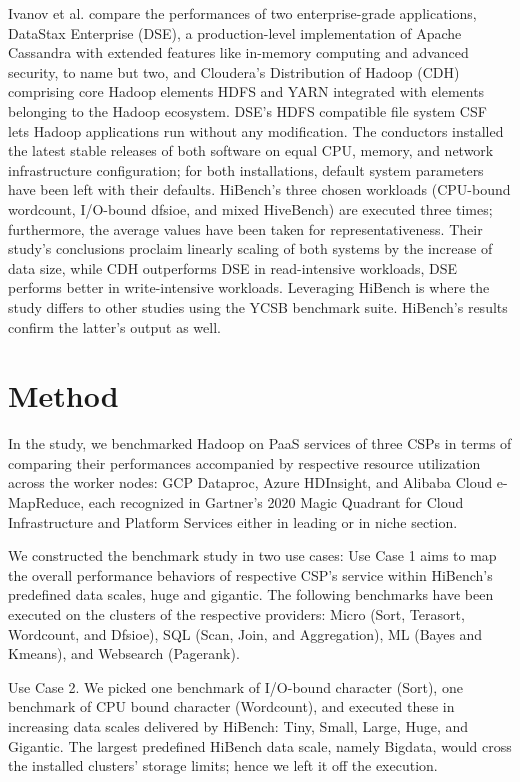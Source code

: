 \documentclass[review]{elsarticle}
\begin{document}
Ivanov et al. \cite{ivanov_performance_2015} compare the performances of two enterprise-grade applications, DataStax Enterprise (DSE), a production-level implementation of Apache Cassandra with extended features like in-memory computing and advanced security, to name but two, and Cloudera's Distribution of Hadoop (CDH) comprising core Hadoop elements HDFS and YARN integrated with elements belonging to the Hadoop ecosystem. DSE's HDFS compatible file system CSF lets Hadoop applications run without any modification. The conductors installed the latest stable releases of both software on equal CPU, memory, and network infrastructure configuration; for both installations, default system parameters have been left with their defaults. HiBench's three chosen workloads (CPU-bound wordcount, I/O-bound dfsioe, and mixed HiveBench) are executed three times; furthermore, the average values have been taken for representativeness. Their study's conclusions proclaim linearly scaling of both systems by the increase of data size, while CDH outperforms DSE in read-intensive workloads, DSE performs better in write-intensive workloads. Leveraging HiBench is where the study differs to other studies using the YCSB benchmark suite. HiBench's results confirm the latter's output as well.

\section{Method}

In the study, we benchmarked Hadoop on PaaS services of three CSPs in terms of comparing their performances accompanied by respective resource utilization across the worker nodes: GCP Dataproc, Azure HDInsight, and Alibaba Cloud e-MapReduce, each recognized in Gartner's 2020 Magic Quadrant for Cloud Infrastructure and Platform Services \cite{noauthor_gartner_nodate} either in leading or in niche section.

We constructed the benchmark study in two use cases: Use Case 1 aims to map the overall performance behaviors of respective CSP's service within HiBench's predefined data scales, huge and gigantic. The following benchmarks have been executed on the clusters of the respective providers: Micro (Sort, Terasort, Wordcount, and Dfsioe), SQL (Scan, Join, and Aggregation), ML (Bayes and Kmeans), and Websearch (Pagerank).

Use Case 2. We picked one benchmark of I/O-bound character (Sort), one benchmark of CPU bound character (Wordcount), and executed these in increasing data scales delivered by HiBench: Tiny, Small, Large, Huge, and Gigantic. The largest predefined HiBench data scale, namely Bigdata, would cross the installed clusters' storage limits; hence we left it off the execution.
\end{document}
